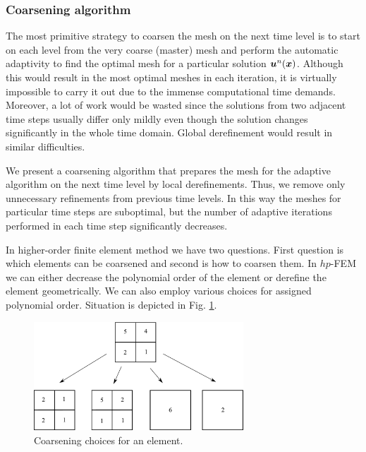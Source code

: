 \subsubsection{Coarsening algorithm}

The most primitive strategy to coarsen the mesh on the next time level is to start on each level from the very coarse (master) mesh and perform the automatic adaptivity to find the optimal mesh for a particular solution $\mbox{\boldmath $u$}^n(\mbox{\boldmath $x$})$. Although this would result in the most optimal meshes in each iteration, it is virtually impossible to carry it out due to the immense computational time demands. Moreover, a lot of work would be wasted since the solutions from two adjacent time steps usually differ only mildly even though the solution changes significantly in the whole time domain. Global derefinement would result in similar difficulties. 

We present a coarsening algorithm that prepares the mesh for the adaptive algorithm on the next time level by local derefinements. Thus, we remove only unnecessary refinements from previous time levels. In this way the meshes for particular time steps are suboptimal, but the number of adaptive iterations performed in each time step significantly decreases.

In higher-order finite element method we have two questions. First question is which elements can be coarsened and second is how to coarsen them. In $hp$-FEM we can either decrease the polynomial order of the element or derefine the element geometrically. We can also employ various choices for assigned polynomial order. Situation is depicted in Fig. \ref{fig:coarse}. 

\begin{figure}[ht]
  \centering
  \includegraphics[width=0.7\textwidth]{img/coarsening.pdf}
  \caption{Coarsening choices for an element.}
  \label{fig:coarse}
\end{figure}

